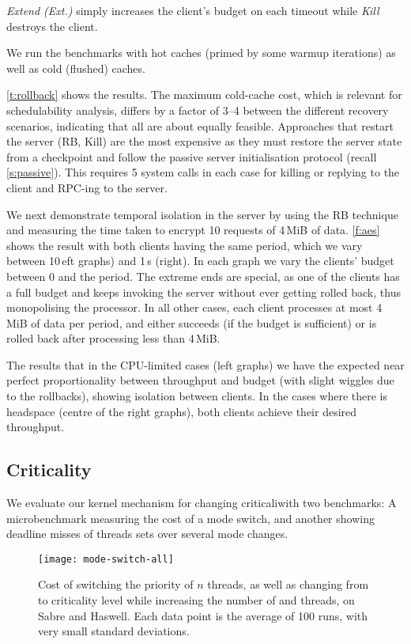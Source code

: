 \emph{Extend (Ext.)} simply increases the client's budget on each timeout while \emph{Kill} destroys the client.

We run the benchmarks with hot caches (primed by some warmup
iterations)  as well as cold (flushed) caches.

\autoref{t:rollback} shows the results. The maximum
cold-cache cost, which is relevant for schedulability analysis,
differs by a factor of 3--4 between the different recovery scenarios,
indicating that all are about equally feasible.
Approaches that restart the server (RB, Kill) are the most expensive
as they must restore the server state from a
checkpoint and follow the passive server initialisation protocol
(recall \autoref{s:passive}). This requires
5 system calls in each case for killing or replying to the client and RPC-ing to the server.

We next demonstrate temporal isolation in the server by using the RB
technique and measuring the time taken to encrypt 10 requests of 4\,MiB of
data. \autoref{f:aes} shows the result with both clients having the same
period, which we vary between 10\,eft graphs) and 1\,s
(right). In each graph  we vary the clients' budget between 0 and the
period. The extreme ends are special, as one of the clients has a full
budget and keeps invoking the server without ever getting rolled back,
thus monopolising the processor. In all other cases, each client
processes at most 4\,MiB of data per period, and either succeeds (if
the budget is sufficient) or is rolled back after processing less than 4\,MiB.

The results that in the CPU-limited cases (left graphs)
we have the expected near perfect proportionality between throughput and
budget (with slight wiggles due to the rollbacks), showing isolation between clients. In the cases where there is headspace (centre of the right
graphs), both clients achieve their desired throughput.

\subsection{Criticality}

We evaluate our kernel mechanism for changing criticaliwith two benchmarks: A
microbenchmark measuring the cost of a mode switch, and another showing deadline misses of threads sets over several mode changes.

\begin{figure}[t]
  \centering
  \texttt{[image: mode-switch-all]}
  \caption{Cost of switching the priority of $n$ threads, as well as changing from  to
   criticality level while increasing the number of  and  threads,
  on Sabre and Haswell. Each data point is the average of 100 runs, with very small standard
  deviations.}
  \label{f:mode-switch}
\end{figure}

